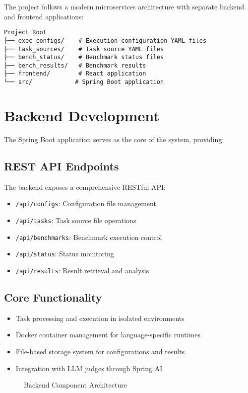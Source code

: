 The project follows a modern microservices architecture with separate backend and frontend applications:

\begin{verbatim}
Project Root
├── exec_configs/    # Execution configuration YAML files
├── task_sources/    # Task source YAML files
├── bench_status/    # Benchmark status files
├── bench_results/   # Benchmark results
├── frontend/        # React application
└── src/            # Spring Boot application
\end{verbatim}

\section{Backend Development}

The Spring Boot application serves as the core of the system, providing:

\subsection{REST API Endpoints}
The backend exposes a comprehensive RESTful API:
\begin{itemize}
    \item \texttt{/api/configs}: Configuration file management
    \item \texttt{/api/tasks}: Task source file operations
    \item \texttt{/api/benchmarks}: Benchmark execution control
    \item \texttt{/api/status}: Status monitoring
    \item \texttt{/api/results}: Result retrieval and analysis
\end{itemize}

\subsection{Core Functionality}
\begin{itemize}
    \item Task processing and execution in isolated environments
    \item Docker container management for language-specific runtimes
    \item File-based storage system for configurations and results
    \item Integration with LLM judges through Spring AI
\end{itemize}

\begin{figure}[h]
    \centering
    \caption{Backend Component Architecture}
    \label{fig:backend-arch}
\end{figure}

